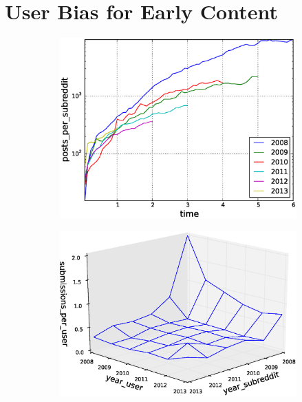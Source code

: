 \section{User Bias for Early Content}

\begin{figure}[!tb]
\centering
\begin{subfigure}{.3\textwidth}\includegraphics[scale=0.285]{./images/posts_per_subreddit_cohorts.eps}\caption{}\end{subfigure}
\begin{subfigure}{.3\textwidth}\includegraphics[scale=0.285]{./images/user_subreddit_submissions_cohorts.eps}\caption{}\end{subfigure}

\end{figure}
